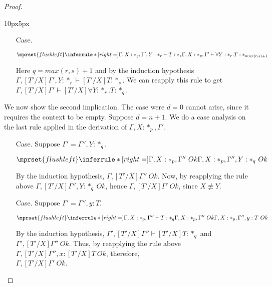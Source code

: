\begin{proof}
\begin{changemargin}{10px}{5px}
\begin{itemize}
  \item[Case.]\ \\
    \begin{center}
      \begin{math}
        $$\mprset{flushleft}
        \inferrule* [right=] {
          \Gamma,X : *_q,\Gamma',Y:*_r \vdash T : *_s
        }{\Gamma,X:*_p,\Gamma' \vdash \forall Y:*_r.T : *_{max(r,s)+1}}
      \end{math}
    \end{center}
    Here $q = max(r,s) + 1$ and by the induction hypothesis 
    $\Gamma,[T'/X]\Gamma',Y:*_r \vdash [T'/X]T:*_s$.  We can reapply this rule to get 
    $\Gamma,[T'/X]\Gamma' \vdash [T'/X] \forall Y:*_r.T:*_q$.
  \end{itemize}

  \noindent We now show the second implication.
  The case were $d = 0$ cannot arise, since it requires the context to be empty.
  Suppose $d = n + 1$.  We do a case analysis on the last rule applied in the derivation of 
  $\Gamma,X:*_p,\Gamma'$.
  \begin{itemize}
  \item[Case.] Suppose $\Gamma' = \Gamma'',Y:*_q$.\ \\
    \begin{center}
      \begin{math}
        $$\mprset{flushleft}
        \inferrule* [right=] {
          \Gamma,X:*_p,\Gamma''\ Ok
        }{\Gamma,X:*_p,\Gamma'',Y:*_q\ Ok}
      \end{math}
    \end{center}
    By the induction hypothesis, $\Gamma,[T'/X]\Gamma''\ Ok$.  Now, by reapplying
    the rule above $\Gamma,[T'/X]\Gamma'',Y:*_q\ Ok$, hence $\Gamma,[T'/X]\Gamma'\ Ok$, 
    since $X \not \equiv Y$.
  \item[Case.]Suppose $\Gamma' = \Gamma'',y:T$.\ \\
    \begin{center}
      \begin{math}
        $$\mprset{flushleft}
        \inferrule* [right=] {
          \Gamma,X:*_p,\Gamma'' \vdash T:*_q
          \\
          \Gamma,X:*_p,\Gamma''\ Ok
        }{\Gamma,X:*_p,\Gamma'',y :T\ Ok}
      \end{math} 
    \end{center}
    By the induction hypothesis, $\Gamma',[T'/X]\Gamma'' \vdash [T'/X]T:*_q$ and 
    $\Gamma',[T'/X]\Gamma''\ Ok$.  Thus,
    by reapplying the rule above $\Gamma,[T'/X]\Gamma'',x:[T'/X]T\ Ok$, therefore,\\
    $\Gamma,[T'/X]\Gamma'\ Ok$.
  \end{itemize}
  \end{changemargin}
\end{proof}


